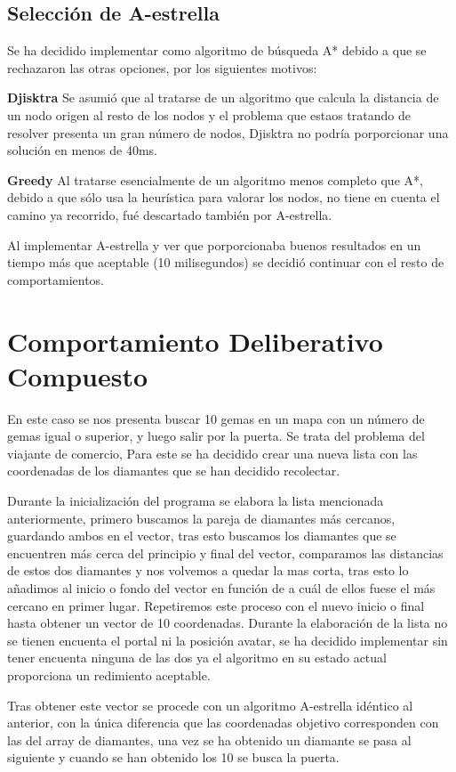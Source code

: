 \subsection{Selección de A-estrella}
Se ha decidido implementar como algoritmo de búsqueda A* debido a que se rechazaron las otras opciones, por los siguientes motivos:

\textbf{Djisktra} Se asumió que al tratarse de un algoritmo que calcula la distancia de un nodo origen al resto de los nodos y el problema que estaos tratando de resolver presenta un gran número de nodos, Djisktra no podría porporcionar una solución en menos de 40ms.

\textbf{Greedy} Al tratarse esencialmente de un algoritmo menos completo que A*, debido a que sólo usa la heurística para valorar los nodos, no tiene en cuenta el camino ya recorrido, fué descartado también por A-estrella.

Al implementar A-estrella y ver que porporcionaba buenos resultados en un tiempo más que aceptable (10 milisegundos) se decidió continuar con el resto de comportamientos.

\section{Comportamiento Deliberativo Compuesto}
En este caso se nos presenta buscar 10 gemas en un mapa con un número de gemas igual o superior, y luego salir por la puerta. Se trata del problema del viajante de comercio, Para este se ha decidido crear una nueva lista con las coordenadas de los diamantes que se han decidido recolectar.

Durante la inicialización del programa se elabora la lista mencionada anteriormente, primero buscamos la pareja de diamantes más cercanos, guardando ambos en el vector, tras esto buscamos los diamantes que se encuentren más cerca del principio y final del vector, comparamos las distancias de estos dos diamantes y nos volvemos a quedar la mas corta, tras esto lo añadimos al inicio o fondo del vector en función de a cuál de ellos fuese el más cercano en primer lugar. Repetiremos este proceso con el nuevo inicio o final hasta obtener un vector de 10 coordenadas. Durante la elaboración de la lista no se tienen encuenta el portal ni la posición avatar, se ha decidido implementar sin tener encuenta ninguna de las dos ya el algoritmo en su estado actual proporciona un redimiento aceptable.

Tras obtener este vector se procede con un algoritmo A-estrella idéntico al anterior, con la única diferencia que las coordenadas objetivo corresponden con las del array de diamantes, una vez se ha obtenido un diamante se pasa al siguiente y cuando se han obtenido los 10 se busca la puerta.

